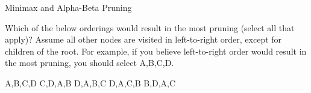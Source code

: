 \begin{problem}{Minimax and Alpha-Beta Pruning}
\begin{question}[4]
\end{question}

\begin{question}[4]
Which of the below orderings would result in the most pruning (select all that apply)? Assume all other nodes are visited in left-to-right order, except for children of the root. For example, if you believe left-to-right order would result in the most pruning, you should select A,B,C,D.

\solution{\emptysquare}{\SixDi} A,B,C,D
\qquad
\solution{\emptysquare}{\SixDii} C,D,A,B
\qquad
\solution{\emptysquare}{\SixDiii} D,A,B,C
\qquad
\solution{\emptysquare}{\SixDiv} D,A,C,B
\qquad
\solution{\emptysquare}{\SixDv} B,D,A,C

\end{question}
\end{problem}